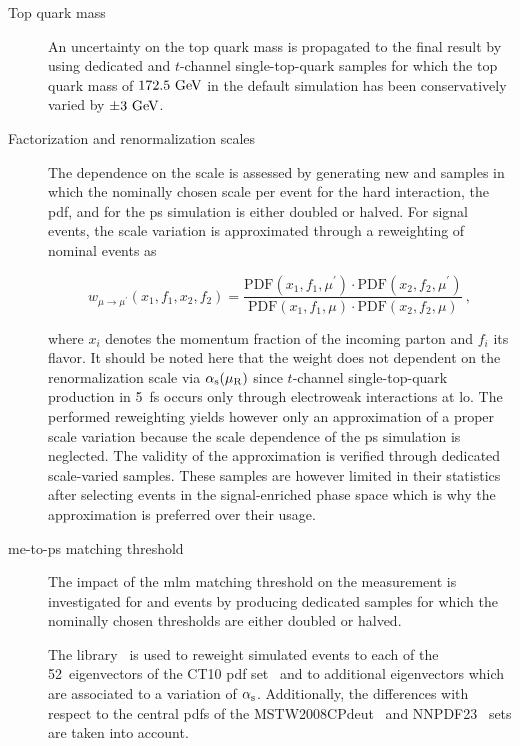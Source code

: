 \begin{description}
\item[Top quark mass] An uncertainty on the top quark mass is propagated to the final result by using dedicated \ttbar and $t$-channel single-top-quark samples for which the top quark mass of $172.5~\textrm{GeV}$ in the default simulation has been conservatively varied by $\pm3~\textrm{GeV}$.

\item[Factorization and renormalization scales] The dependence on the scale is assessed by generating new \ttbar and \wjets samples in which the nominally chosen scale per event for the hard interaction, the \gls{pdf}, and for the \gls{ps} simulation is either doubled or halved. For signal events, the scale variation is approximated through a reweighting of nominal events as

\begin{equation}
w_{\mu\to \mu^\prime}(x_1,f_1,x_2,f_2)=\frac{\mathrm{PDF}(x_{1},f_{1},\mu^\prime)\cdot\mathrm{PDF}(x_{2},f_{2},\mu^\prime)}{\mathrm{PDF}(x_{1},f_{1},\mu)\cdot\mathrm{PDF}(x_{2},f_{2},\mu)}\,,
\end{equation}

where $x_{i}$ denotes the momentum fraction of the incoming parton and $f_{i}$ its flavor. It should be noted here that the weight does not dependent on the renormalization scale via ${\alpha_\textrm{s}}(\mu_\mathrm{R})$ since $t$-channel single-top-quark production in 5~\gls{fs} occurs only through electroweak interactions at \gls{lo}. The performed reweighting yields however only an approximation of a proper scale variation because the scale dependence of the \gls{ps} simulation is neglected. The validity of the approximation is verified through dedicated scale-varied samples. These samples are however limited in their statistics after selecting events in the signal-enriched phase space which is why the approximation is preferred over their usage.

\item[\gls{me}-to-\gls{ps} matching threshold] The impact of the \gls{mlm} matching threshold on the measurement is investigated for \ttbar and \wjets events by producing dedicated samples for which the nominally chosen thresholds are either doubled or halved.
 
\item[] The \LHAPDF library~\cite{Buckley:2014ana} is used to reweight simulated events to each of the 52~eigenvectors of the CT10 \gls{pdf} set~\cite{Lai:2010vv} and to additional eigenvectors which are associated to a variation of ${\alpha_\textrm{s}}$. Additionally, the differences with respect to the central \glspl{pdf} of the MSTW2008CPdeut~\cite{Martin:2012da} and NNPDF23~\cite{Ball:2012cx} sets are taken into account.
\end{description}



